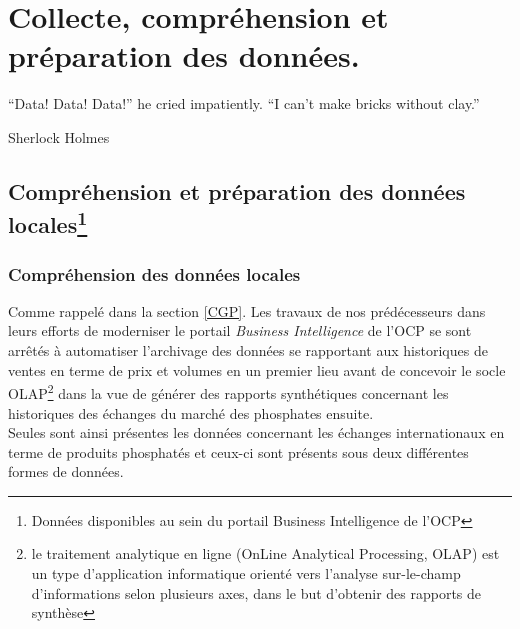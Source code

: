 \chapter{Collecte, compréhension et préparation des données.}
\epigraph{“Data! Data! Data!” he cried impatiently. “I can’t make bricks without clay.”}{Sherlock Holmes}	
\cleardoublepage
\newcommand{\reels}{\mathbb{R}}
	\section{Compréhension et préparation des données locales\protect\footnote{Données disponibles au sein du portail Business Intelligence de l'OCP}}
	\subsection{Compréhension des données locales}
	Comme rappelé dans la section \ref{CGP}. Les travaux de nos prédécesseurs dans leurs efforts de moderniser le portail \textit{Business Intelligence} de l'OCP se sont arrêtés à automatiser l'archivage des données se rapportant aux historiques de ventes en terme de prix et volumes en un premier lieu\cite{CHEMLAL} avant de concevoir le socle OLAP\footnote{le traitement analytique en ligne (OnLine Analytical Processing, OLAP) est un type d'application informatique orienté vers l'analyse sur-le-champ d'informations selon plusieurs axes, dans le but d'obtenir des rapports de synthèse} dans la vue de générer des rapports synthétiques concernant les historiques des échanges du marché des phosphates ensuite\cite{NACER}.\\
	Seules sont ainsi présentes les données concernant les échanges internationaux en terme de produits phosphatés et ceux-ci sont présents sous deux différentes formes de données.
